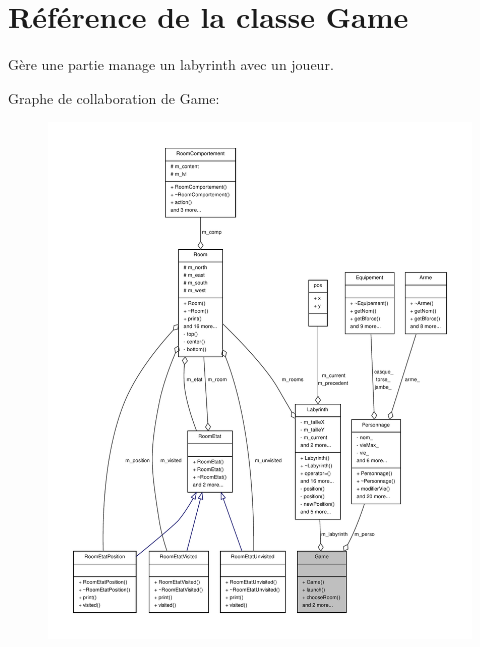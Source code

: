 \section{Référence de la classe Game}
\label{class_game}


Gère une partie manage un labyrinth avec un joueur.  




Graphe de collaboration de Game\-:\nopagebreak
\begin{figure}[H]
\begin{center}
\leavevmode
\includegraphics[width=350pt]{class_game__coll__graph}
\end{center}
\end{figure}
